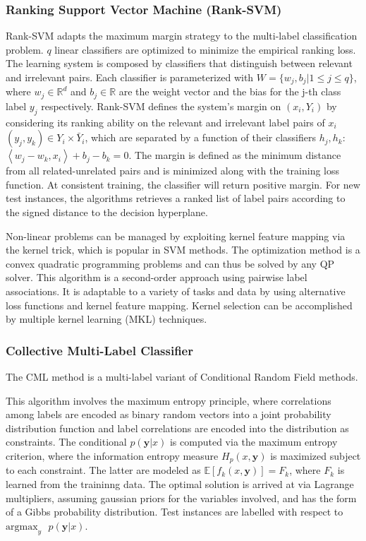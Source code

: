 \documentclass[12pt]{report}
\begin{document}
	\subsubsection*{Ranking Support Vector Machine (Rank-SVM)}
	Rank-SVM adapts the maximum margin strategy to the multi-label classification
  problem. $q$ linear classifiers are optimized to minimize the empirical
  ranking loss. The learning system is composed by classifiers that distinguish
  between relevant and irrelevant pairs. Each classifier is parameterized with $W = \{w_j,b_j | 1 \leq j \leq q\}$, where $w_j \in \mathbb{R}^d$ and $b_j \in \mathbb{R}$ are the weight vector and the bias
	for the j-th class label $y_j$ respectively. Rank-SVM defines the system’s
  margin on $(x_i,Y_i)$ by considering its ranking ability on the relevant and
  irrelevant label pairs of $x_i$ $(y_j,y_k) \in Y_i \times \bar Y_i$, which are
  separated by a function of their classifiers $h_j, h_k$: $\left<w_j-w_k, x_i
  \right> + b_j - b_k=0$. The margin is defined as the minimum distance from all
  related-unrelated pairs and is minimized along with the training loss
  function. At consistent training, the classifier will return positive margin.
  For new test instances, the algorithms retrieves a ranked list of label pairs
  according to the signed distance to the decision hyperplane.
	
	Non-linear problems can be managed by exploiting kernel feature mapping via
  the kernel trick, which is popular in SVM methods. The optimization method is
  a convex quadratic programming problems and can thus be solved by any QP
  solver.
  This algorithm is a second-order approach using pairwise label associations.
  It is adaptable to a variety of tasks and data by using alternative loss
  functions and kernel feature mapping. Kernel selection can be accomplished by
  multiple kernel learning (MKL) techniques.

  \subsubsection*{Collective Multi-Label Classifier}
   The CML method is a multi-label variant of Conditional Random Field methods.

	 This algorithm involves the maximum entropy principle, where correlations
   among labels are encoded as binary random vectors into a joint probability
   distribution function and label correlations are encoded into the
   distribution as constraints.
   The conditional $p(\bm{y} | x)$ is computed via the maximum entropy
   criterion, where the information entropy measure $H_p(x,\bm{y})$ is maximized subject to each constraint.
   The latter are modeled as $ \mathbb{E} [ f_k(x,\bm{y}) ] = F_k  $, where $F_k$ is
 learned from the traininng data.
 The optimal solution is arrived at via Lagrange multipliers, assuming gaussian
 priors for the variables involved, and has the form of a Gibbs probability
 distribution.
 Test instances are labelled with respect to $\text{argmax}_y\text{ }p(\bm{y} | x)$.
\end{document}
